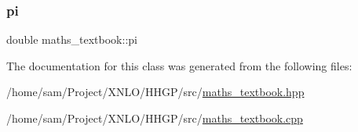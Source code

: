 \subsubsection{\texorpdfstring{pi}{pi}}
{\footnotesize\ttfamily double maths\+\_\+textbook\+::pi}



The documentation for this class was generated from the following files\+:\begin{DoxyCompactItemize}
\item 
/home/sam/\+Project/\+X\+N\+L\+O/\+H\+H\+G\+P/src/\hyperlink{maths__textbook_8hpp}{maths\+\_\+textbook.\+hpp}\item 
/home/sam/\+Project/\+X\+N\+L\+O/\+H\+H\+G\+P/src/\hyperlink{maths__textbook_8cpp}{maths\+\_\+textbook.\+cpp}\end{DoxyCompactItemize}
